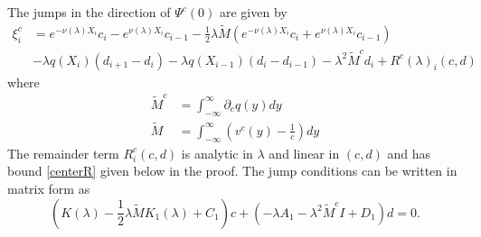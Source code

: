 \documentclass[thesis.tex]{subfiles}
\begin{document}
\begin{lemma}\label{jumpcenteradj}
The jumps in the direction of $\Psi^c(0)$ are given by
\begin{equation}\label{xic}
\begin{aligned}
\xi^c_i &= e^{-\nu(\lambda)X_i} c_i - e^{\nu(\lambda)X_i} c_{i-1} - \frac{1}{2}\lambda \tilde{M} \left( e^{-\nu(\lambda)X_i}c_i + e^{\nu(\lambda)X_i}c_{i-1}\right)\\
&- \lambda q(X_i) (d_{i+1} - d_i ) - \lambda q(X_{i-1}) (d_i - d_{i-1} )
- \lambda^2 \tilde{M}^c d_i + R^c(\lambda)_i(c, d)
\end{aligned}
\end{equation}
where
\begin{align*}
\tilde{M}^c &= \int_{-\infty}^\infty \partial_c q(y) dy \\
\tilde{M} &= \int_{-\infty}^{\infty} \left(v^c(y) - \frac{1}{c}\right) dy
\end{align*}
The remainder term $R^c_i(c, d)$ is analytic in $\lambda$ and linear in $(c, d)$ and has bound \cref{centerR} given below in the proof. The jump conditions can be written in matrix form as
\begin{equation}\label{matrixjumpc}
\left( K(\lambda) -\frac{1}{2} \lambda \tilde{M} K_1(\lambda) + C_1 \right) c + (-\lambda A_1 - \lambda^2 \tilde{M}^c I + D_1) d = 0.
\end{equation}


\end{lemma}
\end{document}
